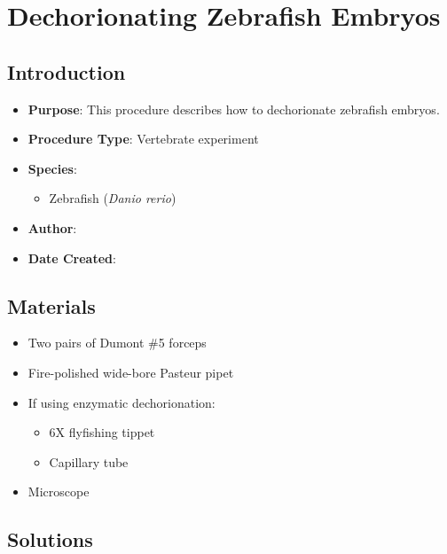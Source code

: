 \documentclass[
  letterpaper,
  DIV=11,
  numbers=noendperiod]{scrreprt}
\providecommand{\tightlist}{%
  \setlength{\itemsep}{0pt}\setlength{\parskip}{0pt}}\usepackage{longtable,booktabs,array}
\begin{document}
\hypertarget{sec-vertexp-zfish_dechorinate}{%
\chapter{Dechorionating Zebrafish
Embryos}\label{sec-vertexp-zfish_dechorinate}}

\hypertarget{introduction-45}{%
\section{Introduction}\label{introduction-45}}

\begin{itemize}
\tightlist
\item
  \textbf{Purpose}: This procedure describes how to dechorionate
  zebrafish embryos.
\item
  \textbf{Procedure Type}: Vertebrate experiment
\item
  \textbf{Species}:

  \begin{itemize}
  \tightlist
  \item
    Zebrafish (\emph{Danio rerio})
  \end{itemize}
\item
  \textbf{Author}:
\item
  \textbf{Date Created}:
\end{itemize}

\hypertarget{materials-42}{%
\section{Materials}\label{materials-42}}

\begin{itemize}
\tightlist
\item
  Two pairs of Dumont \#5 forceps
\item
  Fire-polished wide-bore Pasteur pipet
\item
  If using enzymatic dechorionation:

  \begin{itemize}
  \tightlist
  \item
    6X flyfishing tippet
  \item
    Capillary tube
  \end{itemize}
\item
  Microscope
\end{itemize}

\hypertarget{solutions-38}{%
\section{Solutions}\label{solutions-38}}
\end{document}
